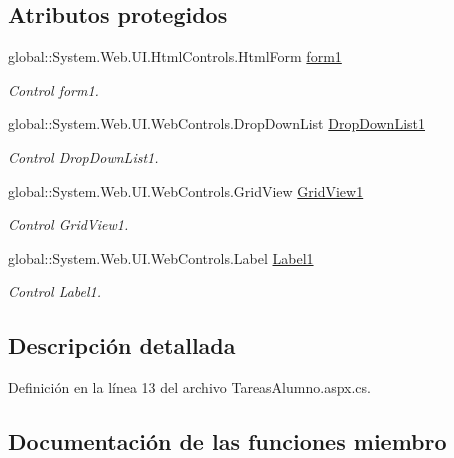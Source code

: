 \subsection*{Atributos protegidos}
\begin{DoxyCompactItemize}
\item 
global\+::\+System.\+Web.\+U\+I.\+Html\+Controls.\+Html\+Form \mbox{\hyperlink{classInicio_1_1Alumno_1_1TareasAlumno_a9a9c1002686b25b5b81e64d6f49111be}{form1}}
\begin{DoxyCompactList}\small\item\em Control form1. \end{DoxyCompactList}\item 
global\+::\+System.\+Web.\+U\+I.\+Web\+Controls.\+Drop\+Down\+List \mbox{\hyperlink{classInicio_1_1Alumno_1_1TareasAlumno_ac2aabbccda02faae4f64bcf85e100556}{Drop\+Down\+List1}}
\begin{DoxyCompactList}\small\item\em Control Drop\+Down\+List1. \end{DoxyCompactList}\item 
global\+::\+System.\+Web.\+U\+I.\+Web\+Controls.\+Grid\+View \mbox{\hyperlink{classInicio_1_1Alumno_1_1TareasAlumno_a00d31bb5bb72e919f1b1eddb71375eac}{Grid\+View1}}
\begin{DoxyCompactList}\small\item\em Control Grid\+View1. \end{DoxyCompactList}\item 
global\+::\+System.\+Web.\+U\+I.\+Web\+Controls.\+Label \mbox{\hyperlink{classInicio_1_1Alumno_1_1TareasAlumno_aa472c0d32d562f35fc34c59867581297}{Label1}}
\begin{DoxyCompactList}\small\item\em Control Label1. \end{DoxyCompactList}\end{DoxyCompactItemize}


\subsection{Descripción detallada}


Definición en la línea 13 del archivo Tareas\+Alumno.\+aspx.\+cs.



\subsection{Documentación de las funciones miembro}
\mbox{\label{classInicio_1_1Alumno_1_1TareasAlumno_ab7341d8a2105b51ae67ab7b551bfe8b8}} 
